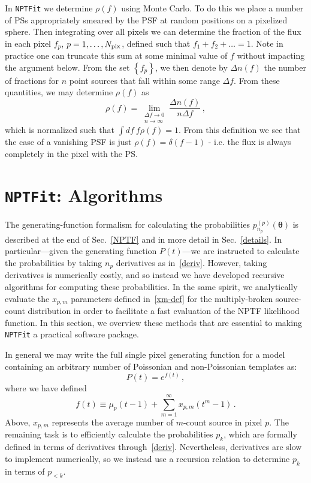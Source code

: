 In \texttt{NPTFit} we determine $\rho(f)$ using Monte Carlo. To do this we place a number of PSs appropriately smeared by the PSF at random positions on a pixelized sphere. Then integrating over all pixels we can determine the fraction of the flux in each pixel $f_p$, $p=1,\ldots, N_{\rm pix}$, defined such that $f_1+f_2+\ldots = 1$. Note in practice one can truncate this sum at some minimal value of $f$ without impacting the argument below. From the set $\left\{f_p \right\}$, we then denote by $\Delta n(f)$ the number of fractions for $n$ point sources that fall within some range $\Delta f$. From these quantities, we may determine $\rho(f)$ as
\begin{equation}
\rho(f) = \lim_{\substack{\Delta f \to 0 \\ n \to \infty}} \frac{\Delta n(f)}{n \Delta f}\,,
\end{equation}
which is normalized such that $\int df~f \rho(f) = 1$. From this definition we see that the case of a vanishing PSF is just $\rho(f) = \delta(f-1)$ - i.e. the flux is always completely in the pixel with the PS.

\section{\texttt{NPTFit}: Algorithms}
\label{algorithms}

The generating-function formalism for calculating the probabilities $p_{n_p}^{(p)}({\bm \theta})$ is described at the end of Sec.~\ref{NPTF} and in more detail in Sec.~\ref{details}.  In particular---given the generating function $P(t)$---we are instructed to calculate the probabilities by taking $n_p$ derivatives as in~\eqref{deriv}.  However, taking derivatives is numerically costly, and so instead we have developed recursive algorithms for computing these probabilities.  In the same spirit, we analytically evaluate the $x_{p,m}$ parameters defined in~\eqref{xm-def} for the multiply-broken source-count distribution in order to facilitate a fast evaluation of the NPTF likelihood function.  In this section, we overview these methods that are essential to making \texttt{NPTFit} a practical software package.   

In general we may write the full single pixel generating function for a model containing an arbitrary number of Poissonian and non-Poissonian templates as:
\begin{equation}
P(t) = e^{f(t)}\,,
\end{equation}
where we have defined
\begin{equation}
f(t) \equiv \mu_p(t-1) + \sum_{m=1}^{\infty} x_{p,m} (t^m - 1)\,.
\end{equation}
Above, $x_{p,m} $ represents the average number of $m$-count source in pixel $p$. The remaining task is to efficiently calculate the probabilities $p_k$, which are formally defined in terms of derivatives through~\eqref{deriv}. Nevertheless, derivatives are slow to implement numerically, so we instead use a recursion relation to determine $p_k$ in terms of $p_{< k}$.


